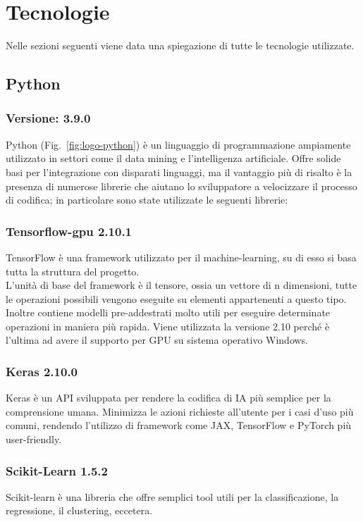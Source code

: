 \newpage

\section{Tecnologie}
\label{sec:tecnologie-strumenti}

Nelle sezioni seguenti viene data una spiegazione di tutte le tecnologie utilizzate.

\subsection{Python}

\subsubsection{Versione: 3.9.0}
Python (Fig.~\ref{fig:logo-python}) è un linguaggio di programmazione ampiamente utilizzato in settori come il data mining e l'intelligenza artificiale. 
Offre solide basi per l'integrazione con disparati linguaggi, ma il vantaggio più di risalto è la presenza di numerose librerie che aiutano lo sviluppatore a velocizzare il processo di codifica; in particolare sono state utilizzate le seguenti librerie:

\subsubsection{Tensorflow-gpu 2.10.1}
TensorFlow è una framework utilizzato per il machine-learning, su di esso si basa tutta la struttura del progetto.\\
L'unità di base del framework è il tensore, ossia un vettore di n dimensioni, tutte le operazioni possibili vengono eseguite su elementi appartenenti a questo tipo.
Inoltre contiene modelli pre-addestrati molto utili per eseguire determinate operazioni in maniera più rapida. 
Viene utilizzata la versione 2.10 perché è l'ultima ad avere il supporto per GPU su sistema operativo Windows.

\subsubsection{Keras 2.10.0}
Keras è un API sviluppata per rendere la codifica di IA più semplice per la comprensione umana. 
Minimizza le azioni richieste all'utente per i casi d'uso più comuni, rendendo l'utilizzo di framework come JAX, TensorFlow e PyTorch più user-friendly.

\subsubsection{Scikit-Learn 1.5.2}
Scikit-learn è una libreria che offre semplici tool utili per la classificazione, la regressione, il clustering, eccetera.

